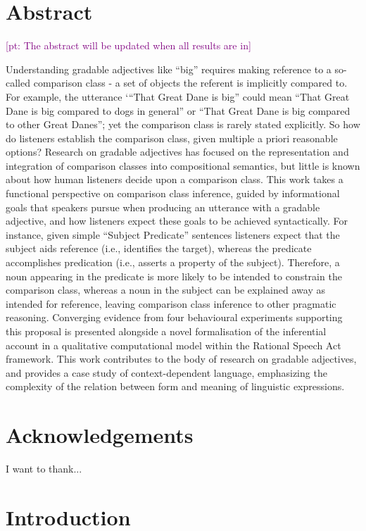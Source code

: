 \documentclass[12pt]{report}
\newcommand{\pt}[1]{\textcolor{Purple}{[pt: #1]}}
\begin{document}


\chapter*{Abstract}
\pt{The abstract will be updated when all results are in}

Understanding gradable adjectives like “big” requires making reference to a so-called comparison class - a set of objects the referent is implicitly compared to. For example, the utterance ‘“That Great Dane is big” could mean “That Great Dane is big compared to dogs in general” or “That Great Dane is big compared to other Great Danes”; yet the comparison class is rarely stated explicitly. So how do listeners establish the comparison class, given multiple a priori reasonable options?
Research on gradable adjectives has focused on the representation and integration of comparison classes into compositional semantics, but little is known about how human listeners decide upon a comparison class. 
This work takes a functional perspective on comparison class inference, guided by informational goals that speakers pursue when producing an utterance with a gradable adjective, and how listeners expect these goals to be achieved syntactically. For instance, given simple “Subject Predicate” sentences listeners expect that the subject aids reference (i.e., identifies the target), whereas the predicate accomplishes predication (i.e., asserts a property of the subject). Therefore, a noun appearing in the predicate is more likely to be intended to constrain the comparison class, whereas a noun in the subject can be explained away as intended for reference, leaving comparison class inference to other pragmatic reasoning. 
Converging evidence from four behavioural experiments supporting this proposal is presented alongside a novel formalisation of the inferential account in a qualitative computational model within the Rational Speech Act framework. This work contributes to the body of research on gradable adjectives, and provides a case study of  context-dependent language, emphasizing the complexity of the relation between form and meaning of linguistic expressions. 


\chapter*{Acknowledgements}
I want to thank...

\tableofcontents
\listoffigures
\listoftables

\chapter{Introduction}
\label{chapter01}

\end{document}
